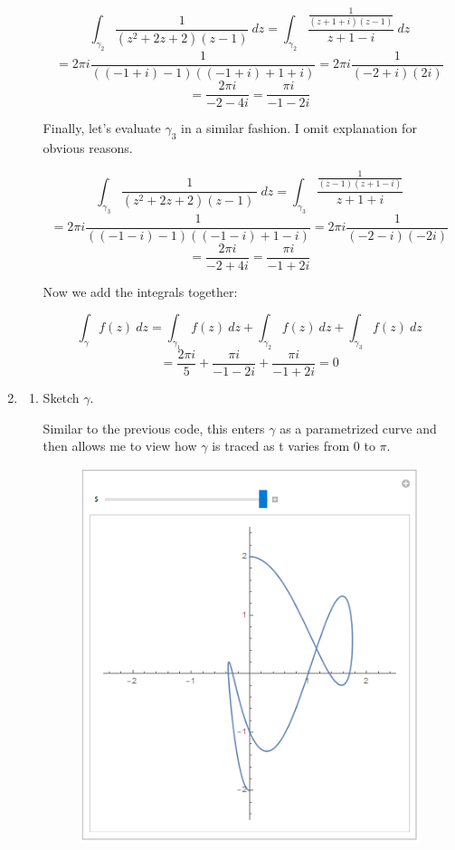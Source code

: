 \documentclass{article}
\begin{document}
\begin{enumerate}
\begin{enumerate}
    \[\int_{\gamma_2}\frac{1}{(z^2+2z+2)(z-1)}\ dz = \int_{\gamma_2}\frac{\frac{1}{(z+1+i)(z-1)}}{z+1-i}\ dz \]
    \[ = 2\pi i\frac{1}{((-1+i)-1)((-1+i)+1+i)} = 2\pi i \frac{1}{(-2+i)(2i)} \]
    \[ =\frac{2\pi i}{-2-4i}=\frac{\pi i}{-1-2i}\] 
    
    Finally, let's evaluate $\gamma_3$ in a similar fashion. I omit explanation for obvious reasons.
    
    \[\int_{\gamma_3}\frac{1}{(z^2+2z+2)(z-1)\  }\ dz = \int_{\gamma_3}\frac{\frac{1}{(z-1)(z+1-i)}}{z+1+i} \]
    \[=2\pi i\frac{1}{((-1-i)-1)((-1-i)+1-i)} =2\pi i \frac{1}{(-2-i)(-2i)}\]
    \[=\frac{2\pi i}{-2+4i} =\frac{\pi i}{-1+2i}\]
    
    Now we add the integrals together:
    
    \[\int_{\gamma}f(z)\ dz= \int_{\gamma_1}f(z)\ dz + \int_{\gamma_2}f(z)\ dz + \int_{\gamma_3}f(z)\ dz \]
    \[= \frac{2\pi i}{5}+\frac{\pi i}{-1-2i}+\frac{\pi i}{-1+2i} = 0\]
	\end{enumerate}
	
	\item 
	\begin{enumerate}
		\item Sketch $\gamma$.
		
		
		
		Similar to the previous code, this enters $\gamma$ as a parametrized curve and then allows me to view how $\gamma$ is traced as t varies from 0 to $\pi$.
		
		\begin{figure}[H]
		\includegraphics[scale=0.8]{image3.png}
		\end{figure}
		

\end{enumerate}
\end{enumerate}
\end{document}
